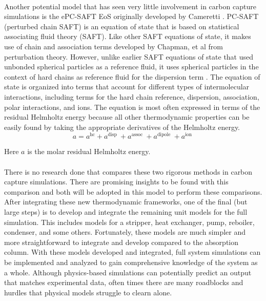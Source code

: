 \documentclass[12pt, letterpaper]{article}
\begin{document}
\paragraph{}
Another potential model that has seen very little involvement in carbon capture simulations is the ePC-SAFT EoS originally developed by Cameretti \cite{Cameretti2005}. PC-SAFT (perturbed chain SAFT) is an equation of state that is based on statistical associating fluid theory (SAFT). Like other SAFT equations of state, it makes use of chain and association terms developed by Chapman, et al from perturbation theory. However, unlike earlier SAFT equations of state that used unbonded spherical particles as a reference fluid, it uses spherical particles in the context of hard chains as reference fluid for the dispersion term \cite{Wikipedia_2023}. The equation of state is organized into terms that account for different types of intermolecular interactions, including terms for the hard chain reference, dispersion, association, polar interactions, and ions. The equation is most often expressed in terms of the residual Helmholtz energy because all other thermodynamic properties can be easily found by taking the appropriate derivatives of the Helmholtz energy.
\begin{equation}
    a=a^{\mathrm{hc}}+a^{\text {disp }}+a^{\text {assoc }}+a^{\text {dipole }}+a^{\text {ion }}
\end{equation}

Here $a$ is the molar residual Helmholtz energy.

\paragraph{}
There is no research done that compares these two rigorous methods in carbon capture simulations. There are promising insights to be found with this comparison and both will be adopted in this model to perform these comparisons. After integrating these new thermodynamic frameworks, one of the final (but large steps) is to develop and integrate the remaining unit models for the full simulation. This includes models for a stripper, heat exchanger, pump, reboiler, condenser, and some others. Fortunately, these models are much simpler and more straightforward to integrate and develop compared to the absorption column. With these models developed and integrated, full system simulations can be implemented and analyzed to gain comprehensive knowledge of the system as a whole.  Although physics-based simulations can potentially predict an output that matches experimental data, often times there are many roadblocks and hurdles that physical models struggle to clearn alone. 
\end{document}
